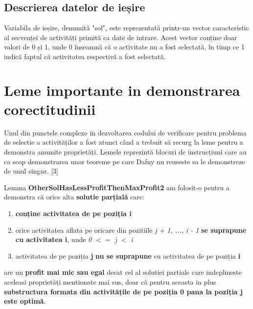 \subsection{Descrierea datelor de ieșire}
Variabila de ieșire, denumită "sol", este reprezentată printr-un vector caracteristic al secvenței de activități primită ca date de intrare. Acest vector conține doar valori de 0 și 1, unde 0 înseamnă că o activitate nu a fost selectată, în timp ce 1 indică faptul că activitatea respectivă a fost selectată.

\section{Leme importante in demonstrarea corectitudinii}
Unul din punctele complexe in dezvoltarea codului de verificare pentru problema de selectie a activităților a fost atunci când a trebuit să recurg la leme pentru a demonstra anumite proprietăți. Lemele reprezintă blocuri de instrucțiuni care au ca scop demonstrarea unor teoreme pe care Dafny nu reuseste sa le demonstreze de unul singur. [3]

Lemma \textbf{OtherSolHasLessProfitThenMaxProfit2} am folosit-o pentru a demonstra că orice alta \textbf{solutie parțială} care:
\begin{enumerate}
    \item \textbf{conține activitatea de pe poziția i}
    \item orice activitatea aflata pe oricare din pozitiile \textit{j + 1, ..., i - 1} \textbf{se suprapune cu activitatea i}, unde \textit{0 $<=$ j $<$ i}
    \item activitatea de pe poziția \textbf{j} \textbf{nu se suprapune} cu activitatea de pe poziția \textbf{i} 
\end{enumerate}
are un \textbf{profit mai mic sau egal} decat cel al solutiei partiale care indeplineste aceleasi proprietăți mentionate mai sus, doar că pentru aceasta in plus \textbf{substructura formata din activitățile de pe poziția 0 pana la poziția j este optimă}. 

